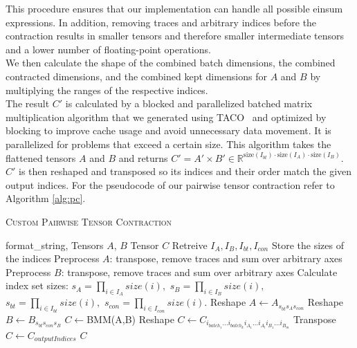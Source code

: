 This procedure ensures that our implementation can handle all possible einsum expressions. In addition, removing traces and arbitrary indices before the contraction results in smaller tensors and therefore smaller intermediate tensors and a lower number of floating-point operations.\\
 We then calculate the shape of the combined batch dimensions, the combined contracted dimensions, and the combined kept dimensions for $A$ and $B$ by multiplying the ranges of the respective indices.\\
 The result $C'$ is calculated by a blocked and parallelized batched matrix multiplication algorithm that we generated using TACO~\cite{kjolstad2017taco} and optimized by blocking to improve cache usage and avoid unnecessary data movement. It is parallelized for problems that exceed a certain size. This algorithm takes the flattened tensors $A$ and $B$ and returns  $C' = A' \times B' \in \mathbb{R}^{\text{size}(I_{bt}) \cdot \text{size}(I_A) \cdot \text{size}(I_B)}$. $C'$ is then reshaped and transposed so its indices and their order match the given output indices. For the pseudocode of our pairwise tensor contraction refer to Algorithm \ref{alg:pc}.  \\
 \begin{algorithm}[H]
    \caption{\textsc{Custom Pairwise Tensor Contraction}}
        \label{alg:pc}
    \begin{algorithmic}[1]
        \REQUIRE format\_string, Tensors $A$, $B$
            \ENSURE Tensor $C$
            \STATE Retreive $I_A , I_B , I_{bt} , I_{con}$
            \STATE Store the sizes of the indices
            \STATE Preprocess $A$: transpose, remove traces and sum over arbitrary axes
            \STATE Preprocess $B$: transpose, remove traces and sum over arbitrary axes
            \STATE Calculate index set sizes: $s_A = \textstyle{\prod\limits_{i\in I_A} size(i)},$ 
            \STATE $s_B = \textstyle{\prod\limits_{i\in I_B} size(i)},$ 
            \STATE $s_{bt} = \textstyle{\prod\limits_{i\in I_{bt}} size(i)},$ 
            \STATE $s_{con} = \textstyle{\prod\limits_{i\in I_{con}} size(i)}.$
            \STATE Reshape $A \leftarrow A_{s_{bt} s_A s_{con}}$
            \STATE Reshape $B \leftarrow B_{s_{bt} s_{con} s_B}$
            \STATE $C\leftarrow$\textsc{BMM}(A,B)
            \STATE Reshape $C\leftarrow C_{i_{{batch}_1}...i_{{batch}_k} i_{{A}_1} ...i_{{A}_l} i_{B_1} ...i_{B_m}}$
            \STATE Transpose $C\leftarrow C_{outputIndices}$
            \RETURN $C$
    \end{algorithmic}
\end{algorithm}
    
